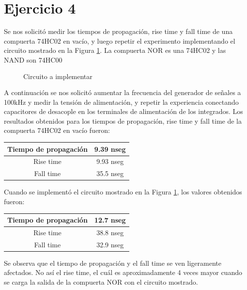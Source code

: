 \part*{Ejercicio 4}
Se nos solicitó medir los tiempos de propagación, rise time y fall time de una compuerta 74HC02 en vacío, y luego repetir el experimento implementando el circuito mostrado en la Figura \ref{4_fig3}. La compuerta NOR es una 74HC02 y las NAND son 74HC00
\begin{figure}[H]
\centering

\caption{Circuito a implementar}
\label{4_fig3} 
\end{figure}
A continuación se nos solicitó aumentar la frecuencia del generador de señales a 100kHz y medir la tensión de alimentación, y repetir la experiencia conectando capacitores de desacople en los terminales de alimentación de los integrados.
Los resultados obtenidos para los tiempos de propagación, rise time y fall time de la compuerta 74HC02 en vacío fueron:

\begin{center}
\begin{tabular}{|c|c|}
\hline 
Tiempo de propagación & 9.39 nseg \\ 
\hline 
Rise time & 9.93 nseg \\ 
\hline 
Fall time & 35.5 nseg \\ 
\hline 
\end{tabular}
\end{center}

Cuando se implementó el circuito mostrado en la Figura \ref{4_fig3}, los valores obtenidos fueron:

\begin{center}
\begin{tabular}{|c|c|}
\hline 
Tiempo de propagación & 12.7 nseg \\ 
\hline 
Rise time & 38.8 nseg \\ 
\hline 
Fall time & 32.9 nseg \\ 
\hline 
\end{tabular}
\end{center}

Se observa que el tiempo de propagación y el fall time se ven ligeramente afectados. No así el rise time, el cuál es aproximadamente 4 veces mayor cuando se carga la salida de la compuerta NOR con el circuito mostrado.

